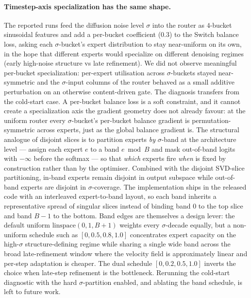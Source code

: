 \documentclass[10pt]{article}
\begin{document}
\paragraph{Timestep-axis specialization has the same shape.}
The reported runs feed the diffusion noise level $\sigma$ into the
router as $4$-bucket sinusoidal features and add a per-bucket
coefficient ($0.3$) to the Switch balance loss, asking each
$\sigma$-bucket's expert distribution to stay near-uniform on its
own, in the hope that different experts would specialize on
different denoising regimes (early high-noise structure vs late
refinement). We did not observe meaningful per-bucket specialization:
per-expert utilisation across $\sigma$-buckets stayed
near-symmetric and the $\sigma$-input columns of the router behaved
as a small additive perturbation on an otherwise content-driven
gate. The diagnosis transfers from the cold-start case. A per-bucket
balance loss is a soft constraint, and it cannot create a
specialization axis the gradient geometry does not already favour:
at the uniform router every $\sigma$-bucket's per-bucket balance
gradient is permutation-symmetric across experts, just as the global
balance gradient is. The structural analogue of disjoint slices is
to partition experts \emph{by} $\sigma$-band at the architecture
level — assign each expert $e$ to a band $e\bmod B$ and mask
out-of-band logits with $-\infty$ before the softmax — so that
\emph{which} experts fire \emph{when} is fixed by construction
rather than by the optimiser. Combined with the disjoint SVD-slice
partitioning, in-band experts remain disjoint in output subspace
while out-of-band experts are disjoint in $\sigma$-coverage. The
implementation ships in the released code with an interleaved
expert-to-band layout, so each band inherits a representative
spread of singular slices instead of binding band $0$ to the top
slice and band $B{-}1$ to the bottom. Band edges are themselves a
design lever: the default uniform $\mathrm{linspace}(0,1,B{+}1)$
weights every $\sigma$-decade equally, but a non-uniform schedule
such as $[0, 0.5, 0.8, 1.0]$ concentrates expert capacity on the
high-$\sigma$ structure-defining regime while sharing a single wide
band across the broad late-refinement window where the velocity
field is approximately linear and per-step adaptation is cheaper.
The dual schedule $[0, 0.2, 0.5, 1.0]$ inverts the choice when
late-step refinement is the bottleneck. Rerunning the cold-start
diagnostic with the hard $\sigma$-partition enabled, and ablating
the band schedule, is left to future work.
\end{document}
